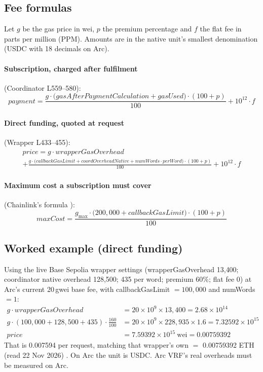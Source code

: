 \documentclass[11pt,a4paper]{article}
\begin{document}
\subsection{Fee formulas}
Let $g$ be the gas price in wei, $p$ the premium percentage and $f$ the flat fee in parts per million (PPM). Amounts are in the native unit's smallest denomination (USDC with 18 decimals on Arc).

\paragraph{Subscription, charged after fulfilment} (Coordinator L559--580):
\[
\mathit{payment} = \frac{g \cdot \big(\mathit{gasAfterPaymentCalculation} + \mathit{gasUsed}\big)\cdot(100+p)}{100} + 10^{12}\cdot f
\]

\paragraph{Direct funding, quoted at request} (Wrapper L433--455):
\begin{multline*}
\mathit{price} = g\cdot \mathit{wrapperGasOverhead}\\
+ \frac{g\cdot\big(\mathit{callbackGasLimit} + \mathit{coordOverheadNative} + \mathit{numWords}\cdot \mathit{perWord}\big)\cdot(100+p)}{100} + 10^{12}\cdot f
\end{multline*}

\paragraph{Maximum cost a subscription must cover} (Chainlink's formula \cite{clsub}):
\[
\mathit{maxCost} = \frac{g_{\max}\cdot\big(200{,}000 + \mathit{callbackGasLimit}\big)\cdot(100+p)}{100}
\]

\subsection{Worked example (direct funding)}
Using the live Base Sepolia wrapper settings (wrapperGasOverhead 13{,}400; coordinator native overhead 128{,}500; 435 per word; premium 60\%; flat fee 0) at Arc's current 20\,gwei base fee, with callbackGasLimit $=100{,}000$ and numWords $=1$:
\begin{align*}
g\cdot \mathit{wrapperGasOverhead} &= 20\times10^{9}\times 13{,}400 = 2.68\times10^{14}\\
g\cdot(100{,}000+128{,}500+435)\cdot\tfrac{160}{100} &= 20\times10^{9}\times 228{,}935\times 1.6 = 7.32592\times10^{15}\\
\mathit{price} &= 7.59392\times10^{15}\ \text{wei} = 0.00759392
\end{align*}
That is 0.007594 per request, matching that wrapper's own  $=$ 0.00759392 ETH (read 22 Nov 2026) \cite{bswrapper}. On Arc the unit is USDC. Arc VRF's real overheads must be measured on Arc.
\end{document}
